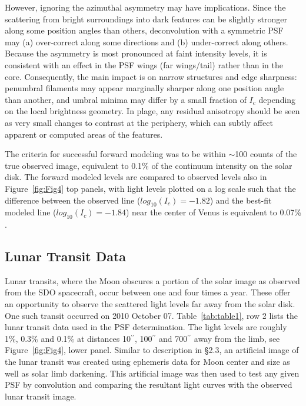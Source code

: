 \documentclass[trackchanges]{aastex62}
\begin{document}
 However, ignoring the azimuthal asymmetry may have implications. Since the scattering from bright surroundings into dark features can be slightly stronger along some position angles than others, deconvolution with a symmetric PSF may (a) over-correct along some directions and (b) under-correct along others. Because the asymmetry is most pronounced at faint intensity levels, it is consistent with an effect in the PSF wings (far wings/tail) rather than in the core. Consequently, the main impact is on narrow structures and edge sharpness: penumbral filaments may appear marginally sharper along one position angle than another, and umbral minima may differ by a small fraction of $I_c$ depending on the local brightness geometry. In plage, any residual anisotropy should be seen as very small changes to contrast at the periphery, which can subtly affect apparent or computed areas of the features. 

The criteria for successful forward modeling was to be within $\sim$100 counts of the true observed image, equivalent to 0.1\% of the continuum intensity on the solar disk.  The forward modeled levels are compared to observed levels also in  Figure~\ref{fig:Fig4} top panels, with light levels plotted on a log scale such that the difference between the observed line ($log_{10}(I_{c}) = - 1.82$) and the best-fit modeled line ($log_{10}(I_{c}) = -1.84$) near the center of Venus is equivalent to 0.07\% . 

\subsection{Lunar Transit Data}\label{sec:sec2.4}

Lunar transits, where the Moon obscures a portion of the solar image as observed from the SDO spacecraft, occur between one and four times a year. These offer an opportunity to observe the scattered light levels far away from the solar disk.  One such transit occurred on 2010 October 07. Table~\ref{tab:table1}, row 2 lists the lunar transit data used in the PSF determination.  The light levels are roughly 1\%, 0.3\% and 0.1\% at distances 10$^{\prime\prime}$, 100$^{\prime\prime}$ and 700$^{\prime\prime}$ away from the limb, see Figure~\ref{fig:Fig4},  lower panel.  Similar to description in \S2.3, an artificial image of the lunar transit was created using ephemeris data for Moon center and size as well as solar limb darkening.  This artificial image was then used to test any given PSF by convolution and comparing the resultant light curves with the observed lunar transit image. 
\end{document}
